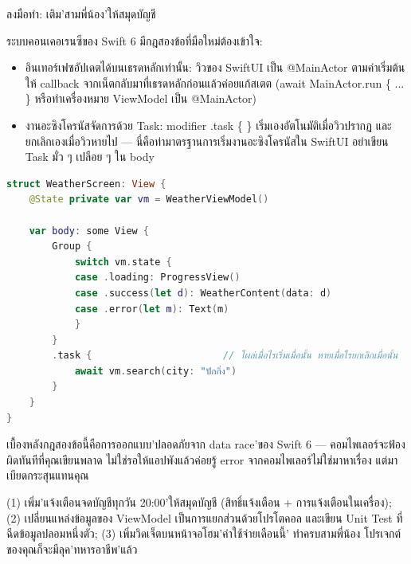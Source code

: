 \begin{tcbpractice}{ลงมือทำ: เติม'สามพี่น้อง'ให้สมุดบัญชี}

ระบบคอนเคอเรนซีของ Swift 6 มีกฎสองข้อที่มือใหม่ต้องเข้าใจ:

\begin{itemize}
  \item อินเทอร์เฟซอัปเดตได้บนเธรดหลักเท่านั้น: วิวของ SwiftUI เป็น @MainActor ตามค่าเริ่มต้น ให้ callback จากเน็ตกลับมาที่เธรดหลักก่อนแล้วค่อยแก้สเตต (await MainActor.run \{ ... \} หรือทำเครื่องหมาย ViewModel เป็น @MainActor)
  \item งานอะซิงโครนัสจัดการด้วย Task: modifier .task \{ \} เริ่มเองอัตโนมัติเมื่อวิวปรากฏ และยกเลิกเองเมื่อวิวหายไป — นี่คือท่ามาตรฐานการเริ่มงานอะซิงโครนัสใน SwiftUI อย่าเขียน Task มั่ว ๆ เปลือย ๆ ใน body
\end{itemize}

\begin{lstlisting}[language=Swift]
struct WeatherScreen: View {
    @State private var vm = WeatherViewModel()

    var body: some View {
        Group {
            switch vm.state {
            case .loading: ProgressView()
            case .success(let d): WeatherContent(data: d)
            case .error(let m): Text(m)
            }
        }
        .task {                       // โผล่เมื่อไรเริ่มเมื่อนั้น หายเมื่อไรยกเลิกเมื่อนั้น
            await vm.search(city: "ปักกิ่ง")
        }
    }
}
\end{lstlisting}

เบื้องหลังกฎสองข้อนี้คือการออกแบบ'ปลอดภัยจาก data race'ของ Swift 6 — คอมไพเลอร์จะฟ้องผิดทันทีที่คุณเขียนพลาด ไม่ใช่รอให้แอปพังแล้วค่อยรู้ error จากคอมไพเลอร์ไม่ใช่มาหาเรื่อง แต่มาเบียดกระสุนแทนคุณ

(1) เพิ่ม'แจ้งเตือนจดบัญชีทุกวัน 20:00'ให้สมุดบัญชี (สิทธิ์แจ้งเตือน + การแจ้งเตือนในเครื่อง); (2) เปลี่ยนแหล่งข้อมูลของ ViewModel เป็นการแยกส่วนด้วยโปรโตคอล และเขียน Unit Test ที่ฉีดข้อมูลปลอมหนึ่งตัว; (3) เพิ่มวิดเจ็ตบนหน้าจอโฮม'ค่าใช้จ่ายเดือนนี้' ทำครบสามพี่น้อง โปรเจกต์ของคุณก็จะมีลุค'ทหารอาชีพ'แล้ว

\end{tcbpractice}

